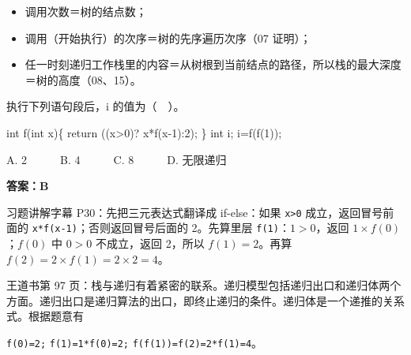\documentclass[10.5pt,a4paper,oneside]{article}
\newcommand{\hlred}[1]{\textcolor{wdred}{\bfseries #1}}
\providecommand{\tightlist}{\setlength{\itemsep}{2pt}\setlength{\parskip}{0pt}}
\newenvironment{Shaded}{}{}
\newcommand{\ControlFlowTok}[1]{\textcolor[rgb]{0.12,0.31,0.71}{#1}}
\newcommand{\DataTypeTok}[1]{\textcolor[rgb]{0.12,0.31,0.71}{#1}}
\newcommand{\DecValTok}[1]{\textcolor[rgb]{0.77,0.35,0.07}{#1}}
\newcommand{\NormalTok}[1]{#1}
\newcommand{\OperatorTok}[1]{\textcolor[rgb]{0.20,0.20,0.20}{#1}}
\begin{document}
\begin{itemize}
\tightlist
\item
  调用次数＝树的结点数；
\item
  调用（开始执行）的次序＝树的先序遍历次序（07 证明）；
\item
  任一时刻递归工作栈里的内容＝从树根到当前结点的路径，所以栈的最大深度＝树的高度（08、15）。
\end{itemize}

\begin{questionbox}[05]

执行下列语句段后，i 的值为（　）。

\begin{Shaded}
\begin{Highlighting}[]
\DataTypeTok{int}\NormalTok{ f}\OperatorTok{(}\DataTypeTok{int}\NormalTok{ x}\OperatorTok{)\{}
    \ControlFlowTok{return} \OperatorTok{((}\NormalTok{x}\OperatorTok{\textgreater{}}\DecValTok{0}\OperatorTok{)?}\NormalTok{ x}\OperatorTok{*}\NormalTok{f}\OperatorTok{(}\NormalTok{x}\OperatorTok{{-}}\DecValTok{1}\OperatorTok{):}\DecValTok{2}\OperatorTok{);}
\OperatorTok{\}}
\DataTypeTok{int}\NormalTok{ i}\OperatorTok{;}
\NormalTok{i}\OperatorTok{=}\NormalTok{f}\OperatorTok{(}\NormalTok{f}\OperatorTok{(}\DecValTok{1}\OperatorTok{));}
\end{Highlighting}
\end{Shaded}

A. 2　　　B. 4　　　C. 8　　　D. 无限递归

\end{questionbox}

\hlred{\textbf{答案：B}}

\begin{videobox}

习题讲解字幕 P30：先把三元表达式翻译成 if-else：如果
\texttt{x\textgreater{}0} 成立，返回冒号前面的
\texttt{x*f(x-1)}；否则返回冒号后面的 2。先算里层
\texttt{f(1)}：\(1>0\)，返回 \(1\times f(0)\)；\(f(0)\) 中 \(0>0\)
不成立，返回 2，所以 \(f(1)=2\)。再算 \(f(2)=2\times f(1)=2\times2=4\)。

\end{videobox}

\begin{jiexibox}

王道书第 97
页：栈与递归有着紧密的联系。递归模型包括递归出口和递归体两个方面。递归出口是递归算法的出口，即终止递归的条件。递归体是一个递推的关系式。根据题意有

\texttt{f(0)=2;} \texttt{f(1)=1*f(0)=2;}
\texttt{f(f(1))=f(2)=2*f(1)=4}。

\end{jiexibox}
\end{document}
